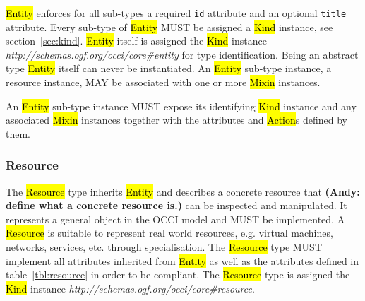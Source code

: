 \documentclass[10pt,a4paper]{article}
\begin{document}

\hl{Entity} enforces for all sub-types a required \texttt{id} attribute and an
optional \texttt{title} attribute.
%
Every sub-type of \hl{Entity} MUST be assigned a \hl{Kind} instance, see
section~\ref{sec:kind}. \hl{Entity} itself is assigned the \hl{Kind} instance
\textit{http://schemas.ogf.org/occi/core\#entity} for type identification. Being 
an abstract type \hl{Entity} itself can never be instantiated.
%
An \hl{Entity} sub-type instance, a resource instance, MAY be associated with
one or more \hl{Mixin} instances.

An \hl{Entity} sub-type instance MUST expose its identifying \hl{Kind} instance
and any associated \hl{Mixin} instances together with the attributes and
\hl{Action}s defined by them.

\subsubsection{Resource}
\label{sec:resource}
The \hl{Resource} type inherits \hl{Entity} and describes a concrete resource that
\textbf{(Andy: define what a concrete resource is.)}
can be inspected and manipulated. It represents a general object in the OCCI
model and MUST be implemented. A \hl{Resource} is suitable to represent real
world resources, e.g. virtual machines, networks, services, etc. through specialisation.
%
The \hl{Resource} type MUST implement all attributes inherited from \hl{Entity}
as well as the attributes defined in table~\ref{tbl:resource} in order
to be compliant.
%
The \hl{Resource} type is assigned the \hl{Kind} instance
\textit{http://schemas.ogf.org/occi/core\#resource}.
\end{document}
